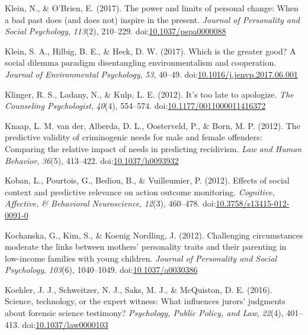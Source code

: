 \documentclass[english,man]{apa6}
\theoremstyle{definition}
\theoremstyle{definition}
\theoremstyle{definition}
\theoremstyle{remark}
\begin{document}
\hypertarget{ref-Klein2017a}{}
Klein, N., \& O'Brien, E. (2017). The power and limits of personal
change: When a bad past does (and does not) inspire in the present.
\emph{Journal of Personality and Social Psychology}, \emph{113}(2),
210--229.
doi:\href{https://doi.org/10.1037/pspa0000088}{10.1037/pspa0000088}

\hypertarget{ref-Klein2017}{}
Klein, S. A., Hilbig, B. E., \& Heck, D. W. (2017). Which is the greater
good? A social dilemma paradigm disentangling environmentalism and
cooperation. \emph{Journal of Environmental Psychology}, \emph{53},
40--49.
doi:\href{https://doi.org/10.1016/j.jenvp.2017.06.001}{10.1016/j.jenvp.2017.06.001}

\hypertarget{ref-Klinger2012}{}
Klinger, R. S., Ladany, N., \& Kulp, L. E. (2012). It's too late to
apologize. \emph{The Counseling Psychologist}, \emph{40}(4), 554--574.
doi:\href{https://doi.org/10.1177/0011000011416372}{10.1177/0011000011416372}

\hypertarget{ref-VanderKnaap2012}{}
Knaap, L. M. van der, Alberda, D. L., Oosterveld, P., \& Born, M. P.
(2012). The predictive validity of criminogenic needs for male and
female offenders: Comparing the relative impact of needs in predicting
recidivism. \emph{Law and Human Behavior}, \emph{36}(5), 413--422.
doi:\href{https://doi.org/10.1037/h0093932}{10.1037/h0093932}

\hypertarget{ref-Koban2012}{}
Koban, L., Pourtois, G., Bediou, B., \& Vuilleumier, P. (2012). Effects
of social context and predictive relevance on action outcome monitoring.
\emph{Cognitive, Affective, \& Behavioral Neuroscience}, \emph{12}(3),
460--478.
doi:\href{https://doi.org/10.3758/s13415-012-0091-0}{10.3758/s13415-012-0091-0}

\hypertarget{ref-Kochanska2012}{}
Kochanska, G., Kim, S., \& Koenig Nordling, J. (2012). Challenging
circumstances moderate the links between mothers' personality traits and
their parenting in low-income families with young children.
\emph{Journal of Personality and Social Psychology}, \emph{103}(6),
1040--1049.
doi:\href{https://doi.org/10.1037/a0030386}{10.1037/a0030386}

\hypertarget{ref-Koehler2016}{}
Koehler, J. J., Schweitzer, N. J., Saks, M. J., \& McQuiston, D. E.
(2016). Science, technology, or the expert witness: What influences
jurors' judgments about forensic science testimony? \emph{Psychology,
Public Policy, and Law}, \emph{22}(4), 401--413.
doi:\href{https://doi.org/10.1037/law0000103}{10.1037/law0000103}
\end{document}
